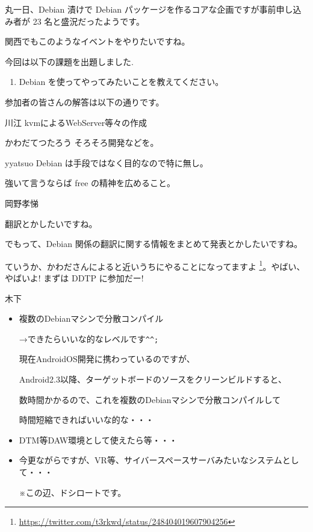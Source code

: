 \documentclass[mingoth,a4paper]{jsarticle}
\begin{document}
丸一日、Debian 漬けで Debian パッケージを作るコアな企画ですが事前申し込み者が 23 名と盛況だったようです。

関西でもこのようなイベントをやりたいですね。



今回は以下の課題を出題しました.
\begin{screen}
  \begin{enumerate}
  \item Debian を使ってやってみたいことを教えてください。
  \end{enumerate}
\end{screen}

参加者の皆さんの解答は以下の通りです。

\begin{prework}{ 川江 }
  kvmによるWebServer等々の作成
\end{prework}

\begin{prework}{ かわだてつたろう }
  そろそろ開発などを。
\end{prework}

\begin{prework}{ yyatsuo }
  Debian は手段ではなく目的なので特に無し。

  強いて言うならば free の精神を広めること。
\end{prework}

\begin{prework}{ 岡野孝悌 }

翻訳とかしたいですね。

でもって、Debian 関係の翻訳に関する情報をまとめて発表とかしたいですね。

ていうか、かわださんによると近いうちにやることになってますよ \footnote{\url{https://twitter.com/t3rkwd/status/248404019607904256}}。やばい、やばいよ! まずは DDTP に参加だー!
\end{prework}

\begin{prework}{ 木下 }
  \begin{itemize}
  \item 複数のDebianマシンで分散コンパイル

    →できたらいいな的なレベルです\verb!^^;!

    現在AndroidOS開発に携わっているのですが、

    Android2.3以降、ターゲットボードのソースをクリーンビルドすると、

    数時間かかるので、これを複数のDebianマシンで分散コンパイルして

    時間短縮できればいいな的な・・・
  \item DTM等DAW環境として使えたら等・・・
  \item 今更ながらですが、VR等、サイバースペースサーバみたいなシステムとして・・・

    ※この辺、ドシロートです。
  \end{itemize}
\end{prework}
\end{document}
